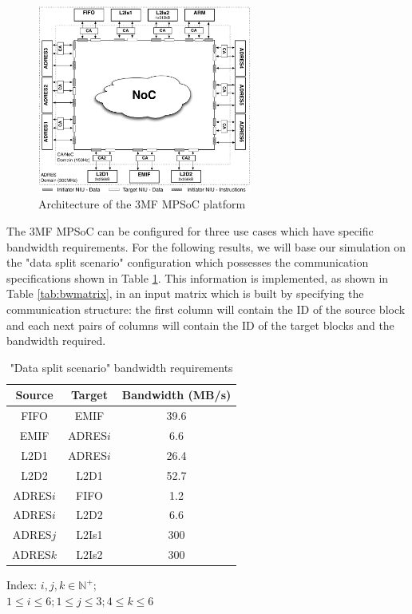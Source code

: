 \begin{figure}[h!]
\begin{center}
\includegraphics[width=7cm]{3MFMPSoC.pdf}
\end{center}
\vspace{-0.3cm}
\caption{Architecture of the 3MF MPSoC platform~\cite{dmilojev08b}}
\label{fig:imec3mf}
\end{figure}

The 3MF MPSoC can be configured for three use cases which have specific bandwidth requirements. For the following results, we will base our simulation on the "data split scenario" configuration which possesses the communication specifications shown in Table \ref{tab:3mfbw}. This information is implemented, as shown in Table \ref{tab:bwmatrix}, in an input matrix which is built by specifying the communication structure: the first column will contain the ID of the source block and each next pairs of columns will contain the ID of the target blocks and the bandwidth required.

\begin{table}[pt!]
\caption{"Data split scenario" bandwidth requirements}
\begin{center}
\begin{scriptsize}
\begin{tabular}{|c|c|c|}
\hline Source & Target & Bandwidth (MB/s)\\
\hline FIFO & EMIF & 39.6\\
EMIF & ADRES$i$ & 6.6\\
L2D1 & ADRES$i$ & 26.4\\
L2D2 & L2D1 & 52.7\\
ADRES$i$ & FIFO & 1.2\\
ADRES$i$ & L2D2 & 6.6\\
ADRES$j$ & L2Is1 & 300\\
ADRES$k$ & L2Is2 & 300\\
\hline
\end{tabular}
\end{scriptsize}
\end{center}
\begin{center}
Index: $i, j, k \in \mathbb{N}^{+};$\\
$1 \leq i \leq 6; 1\leq j \leq 3; 4 \leq k \leq 6$
\end{center}
\label{tab:3mfbw}
\end{table}

